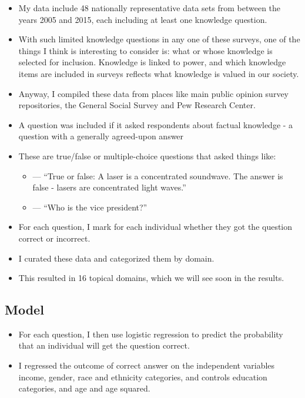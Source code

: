 \documentclass[]{article}
\begin{document}
\vspace{5mm}

\begin{itemize}
  \item{My data include 48 nationally representative data sets from between the years 2005 and 2015, each including at least one knowledge question.}
  \item{With such limited knowledge questions in any one of these surveys, one of the things I think is interesting to consider is: what or whose knowledge is selected for inclusion. Knowledge is linked to power, and which knowledge items are included in surveys reflects what knowledge is valued in our society.}
  \item{Anyway, I compiled these data from places like main public opinion survey repositories, the General Social Survey and Pew Research Center.}
  \item{A question was included if it asked respondents about factual knowledge  - a question with a generally agreed-upon answer}
  \item{These are true/false or multiple-choice questions that asked things like:}
    \begin{itemize}
      \item{--- ``True or false: A laser is a concentrated soundwave. The answer is false - lasers are concentrated light waves.''}
      \item{--- ``Who is the vice president?''}
    \end{itemize}
\end{itemize}

\begin{itemize}
  \item{For each question, I mark for each individual whether they got the question correct or incorrect.}
  \item{I curated these data and categorized them by domain.}
  \item{This resulted in 16 topical domains, which we will see soon in the results.}
\end{itemize}

\subsection{Model}
\begin{itemize}
  \item{For each question, I then use logistic regression to predict the probability that an individual will get the question correct.}
  \item{I regressed the outcome of correct answer on the independent variables income, gender, race and ethnicity categories, and controls education categories, and age and age squared.}
\end{itemize}
\end{document}
